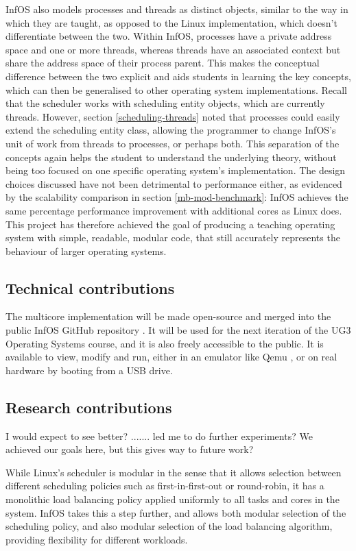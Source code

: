 \documentclass[bsc,frontabs,singlespacing,parskip,deptreport]{infthesis}
\begin{document}
InfOS also models processes and threads as distinct objects, similar to the way in which they are taught, as opposed to the Linux implementation, which doesn't differentiate between the two. Within InfOS, processes have a private address space and one or more threads, whereas threads have an associated context but share the address space of their process parent. This makes the conceptual difference between the two explicit and aids students in learning the key concepts, which can then be generalised to other operating system implementations. Recall that the scheduler works with scheduling entity objects, which are currently threads. However, section \ref{scheduling-threads} noted that processes could easily extend the scheduling entity class, allowing the programmer to change InfOS's unit of work from threads to processes, or perhaps both. This separation of the concepts again helps the student to understand the underlying theory, without being too focused on one specific operating system's implementation. The design choices discussed have not been detrimental to performance either, as evidenced by the scalability comparison in section \ref{mb-mod-benchmark}: InfOS achieves the same percentage performance improvement with additional cores as Linux does. This project has therefore achieved the goal of producing a teaching operating system with simple, readable, modular code, that still accurately represents the behaviour of larger operating systems.

\subsection{Technical contributions}
The multicore implementation will be made open-source and merged into the public InfOS GitHub repository \cite{infos}. It will be used for the next iteration of the UG3 Operating Systems course, and it is also freely accessible to the public. It is available to view, modify and run, either in an emulator like Qemu \cite{qemu}, or on real hardware by booting from a USB drive.

\subsection{Research contributions}
I would expect to see better? ....... led me to do further experiments? We achieved our goals here, but this gives way to future work?

While Linux's scheduler is modular in the sense that it allows selection between different scheduling policies such as first-in-first-out or round-robin, it has a monolithic load balancing policy applied uniformly to all tasks and cores in the system. InfOS takes this a step further, and allows both modular selection of the scheduling policy, and also modular selection of the load balancing algorithm, providing flexibility for different workloads. 
\end{document}
